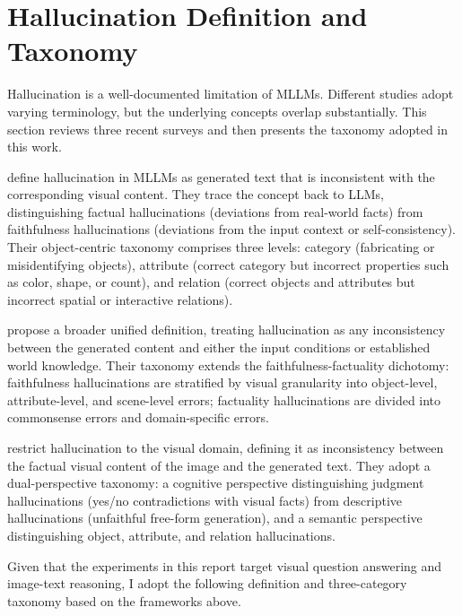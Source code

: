 \section{Hallucination Definition and Taxonomy}

Hallucination is a well-documented limitation of MLLMs.
Different studies adopt varying terminology,
but the underlying concepts overlap substantially.
This section reviews three recent surveys
\citep{baiHallucinationMultimodalLarge2025,
       chenSurveyMultimodalHallucination2026,
       liuSurveyHallucinationLarge2024}
and then presents the taxonomy adopted in this work.

\citet{baiHallucinationMultimodalLarge2025} define hallucination in MLLMs
as generated text that is inconsistent
with the corresponding visual content.
They trace the concept back to LLMs,
distinguishing factual hallucinations (deviations from real-world facts)
from faithfulness hallucinations
(deviations from the input context or self-consistency).
Their object-centric taxonomy comprises three levels:
category (fabricating or misidentifying objects),
attribute (correct category but incorrect properties such as color, shape, or count),
and relation (correct objects and attributes
but incorrect spatial or interactive relations).

\citet{chenSurveyMultimodalHallucination2026} propose a broader unified definition,
treating hallucination as any inconsistency
between the generated content and either the input conditions
or established world knowledge.
Their taxonomy extends the faithfulness-factuality dichotomy:
faithfulness hallucinations are stratified by visual granularity
into object-level, attribute-level, and scene-level errors;
factuality hallucinations are divided into commonsense errors
and domain-specific errors.

\citet{liuSurveyHallucinationLarge2024} restrict hallucination
to the visual domain,
defining it as inconsistency between
the factual visual content of the image
and the generated text.
They adopt a dual-perspective taxonomy:
a cognitive perspective distinguishing judgment hallucinations
(yes/no contradictions with visual facts)
from descriptive hallucinations
(unfaithful free-form generation),
and a semantic perspective distinguishing object, attribute,
and relation hallucinations.

Given that the experiments in this report
target visual question answering and image-text reasoning,
I adopt the following definition and three-category taxonomy
based on the frameworks above.

